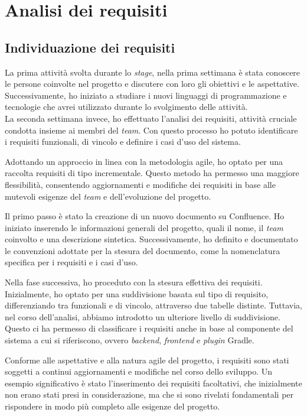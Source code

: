 \section{Analisi dei requisiti}
\subsection*{Individuazione dei requisiti}
La prima attività svolta durante lo \textit{stage}, nella prima settimana è stata conoscere le persone coinvolte nel progetto e
discutere con loro gli obiettivi e le aspettative.\\
Successivamente, ho iniziato a studiare i nuovi linguaggi di programmazione e tecnologie che avrei utilizzato durante lo svolgimento delle attività.\\
La seconda settimana invece, ho effettuato l'analisi dei requisiti, attività cruciale condotta 
insieme ai membri del \textit{team}. Con questo processo ho potuto identificare i requisiti 
funzionali, di vincolo e definire i casi d'uso del sistema.

Adottando un approccio in linea con la metodologia agile, ho optato per una raccolta requisiti di tipo incrementale. 
Questo metodo ha permesso una maggiore flessibilità, consentendo aggiornamenti e modifiche dei requisiti in base alle 
mutevoli esigenze del \textit{team} e dell'evoluzione del progetto.

Il primo passo è stato la creazione di un nuovo documento su Confluence. Ho iniziato inserendo le informazioni 
generali del progetto, quali il nome, il \textit{team} coinvolto e una descrizione sintetica. Successivamente, 
ho definito e documentato le convenzioni adottate per la stesura del documento, come la nomenclatura specifica per 
i requisiti e i casi d'uso.

Nella fase successiva, ho proceduto con la stesura effettiva dei requisiti. Inizialmente, ho optato per una 
suddivisione basata sul tipo di requisito, differenziando tra funzionali e di vincolo, attraverso due tabelle distinte. 
Tuttavia, nel corso dell'analisi, abbiamo introdotto un ulteriore livello di suddivisione. Questo ci ha permesso di 
classificare i requisiti anche in base al componente del sistema a cui si riferiscono, ovvero \textit{backend}, 
\textit{frontend} e \textit{plugin} Gradle.

Conforme alle aspettative e alla natura agile del progetto, i requisiti sono stati soggetti a continui aggiornamenti 
e modifiche nel corso dello sviluppo. Un esempio significativo è stato l'inserimento dei requisiti facoltativi, 
che inizialmente non erano stati presi in considerazione, ma che si sono rivelati fondamentali per rispondere in 
modo più completo alle esigenze del progetto.

